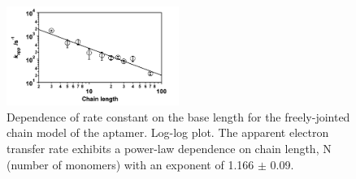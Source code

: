 \begin{figure}[H]
    \centering
    \includegraphics[width = 0.5\textwidth]{img/Plaxco_k_app_vs_length.png}
    \caption{Dependence of rate constant on the base length for the freely-jointed chain model of the aptamer. Log-log plot. The apparent electron transfer rate exhibits a power-law dependence on chain length, N (number of monomers) with an exponent of 1.166 $\pm$ 0.09. \cite{uzawa2010mechanistic}}
    \label{plaxco_plot}
\end{figure}
